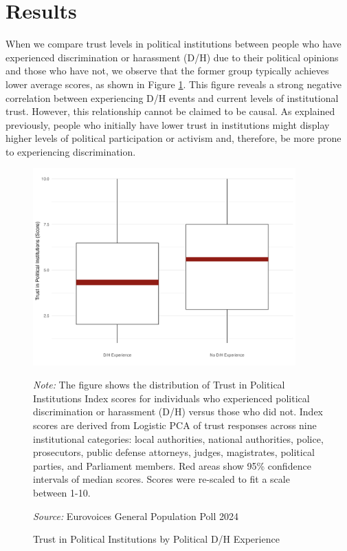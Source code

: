 \documentclass{article}
\begin{document}
\section{Results}

When we compare trust levels in political institutions between people who have experienced discrimination or harassment (D/H) due to their political opinions and those who have not, we observe that the former group typically achieves lower average scores, as shown in Figure \ref{fig:1}. This figure reveals a strong negative correlation between experiencing D/H events and current levels of institutional trust. However, this relationship cannot be claimed to be causal. As explained previously, people who initially have lower trust in institutions might display higher levels of political participation or activism and, therefore, be more prone to experiencing discrimination.

\begin{figure}[htbp]
\centering
\caption{Trust in Political Institutions by Political D/H Experience}
\label{fig:1}
\includegraphics[width=0.9\textwidth]{"viz/fig_trust_comparison_naive.png"}

\medskip
\justifying\footnotesize 
\textit{Note:} The figure shows the distribution of Trust in Political Institutions Index scores for individuals who experienced political discrimination or harassment (D/H) versus those who did not. Index scores are derived from Logistic PCA of trust responses across nine institutional categories: local authorities, national authorities, police, prosecutors, public defense attorneys, judges, magistrates, political parties, and Parliament members. Red areas show 95\% confidence intervals of median scores. Scores were re-scaled to fit a scale between 1-10.

\textit{Source:} Eurovoices General Population Poll 2024
\end{figure}
\end{document}
